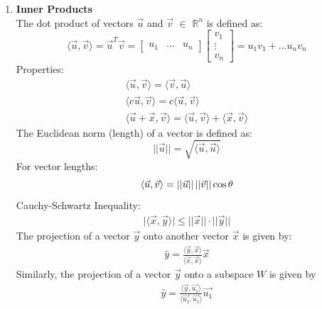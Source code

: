 \documentclass[10pt]{article}
\newcommand{\norm}[1]{\lvert #1 \rvert}
\newcommand{\Est}[1]{\hat{#1}}
\begin{document}
\begin{multicols}{2}
\begin{enumerate}
     
\item \textbf{Inner Products} \\
    The dot product of vectors $\vec{u}$ and $\vec{v}$ $\in$ $\mathbb{R}^n$ is defined as:
    \begin{equation*}
       \langle \vec{u} , \vec{v} \rangle = \vec{u}^T\vec{v} = \begin{bmatrix} u_1 & \hdots & u_n \end{bmatrix}
        \begin{bmatrix} v_1 \\ \vdots \\ v_n \end{bmatrix}
       = u_1v_1+\ldots u_nv_n
    \end{equation*}
    Properties:
    \begin{align*}
        \langle \vec{u} , \vec{v} \rangle  = \langle \vec{v} , \vec{u} \rangle \\
        \langle c\vec{u} , \vec{v} \rangle = c\langle \vec{u} , \vec{v} \rangle \\
        \langle \vec{u} +\vec{x}, \vec{v} \rangle = \langle \vec{u} , \vec{v} \rangle + \langle \vec{x} , \vec{v} \rangle
    \end{align*}
    The Euclidean norm (length) of a vector is defined as:
    \begin{equation*}
        \norm{\norm{\vec{u}}}=\sqrt{\langle \vec{u}, \vec{u} \rangle}
    \end{equation*}
    For vector lengths:
    \begin{equation*}
        \langle \vec{u}, \vec{v} \rangle=\norm{\norm{\vec{u}}}\hspace{.5mm}\norm{\norm{\vec{v}}}\cos{\theta}
    \end{equation*}
    Cauchy-Schwartz Inequality:
    \begin{align*}
        \norm{\langle\vec{x},\vec{y}\rangle} \leq  \norm{\norm{\vec{x}}} \cdot \norm{\norm{\vec{y}}}
    \end{align*}
    The projection of a vector $\vec{y}$ onto another vector $\vec{x}$ is given by:
    \begin{align*}
        \Est{y} = \frac{\langle \vec{y} , \vec{x} \rangle}{\langle \vec{x} , \vec{x} \rangle}\vec{x}
    \end{align*}
    Similarly, the projection of a vector $\vec{y}$ onto a subspace $W$ is given by
    \begin{align*}
        \Est{y} = \frac{\langle \vec{y} , \vec{u_1} \rangle}{\langle \vec{u_1} , \vec{u_1} \rangle}\vec{u_1}

\end{align*}
\end{enumerate}
\end{multicols}
\end{document}
